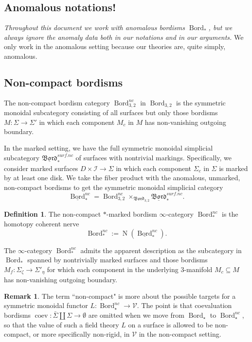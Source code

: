 \documentclass[reqno]{amsart}
\theoremstyle{definition}
\newtheorem{definition}[lemma]{Definition}
\newtheorem{remark}[lemma]{Remark}
\newcommand{\mfk}[1]{\mathfrak{#1}}
\newcommand{\mcl}[1]{\mathcal{#1}}
\newcommand{\msc}[1]{\mathscr{#1}}
\newcommand{\opn}[1]{\operatorname{#1}}
\DeclareMathOperator{\Bord}{Bord}
\renewcommand{\1}{\mathbf{1}}
\begin{document}
\subsection{Anomalous notations!}

{\it Throughout this document we work with anomalous bordisms $\Bord_{\ast}$, but we always ignore the anomaly data both in our notations and in our arguments.} We only work in the anomalous setting because our theories are, quite simply, anomalous.

\subsection{Non-compact bordisms}
\label{sect:nc_bord}

The non-compact bordism category $\Bord^{nc}_{3,2}$ in $\Bord_{3,2}$ is the symmetric monoidal subcategory consisting of all surfaces but only those bordisms $M:\Sigma\to \Sigma'$ in which each component $M_c$ in $M$ has non-vanishing outgoing boundary.

In the marked setting, we have the full symmetric monoidal simplicial subcategory $\underline{\mfk{Bord}}_{\ast}^{surf.nc}$ of surfaces with nontrivial markings.  Specifically, we consider marked surfaces $D\times\mcl{I}\to \Sigma$ in which each component $\Sigma_c$ in $\Sigma$ is marked by at least one disk.  We take the fiber product with the anomalous, unmarked, non-compact bordisms to get the symmetric monoidal simplicial category
\[
\underline{\Bord}_{\ast}^{nc}=\Bord^{nc}_{3,2}\times_{\mfk{Bord}_{3,2}}\underline{\mfk{Bord}}_{\ast}^{surf.nc}.
\]

\begin{definition}\label{def:bord_nc}
The non-compact $\ast$-marked bordism $\infty$-category $\Bord_{\ast}^{nc}$ is the homotopy coherent nerve
\[
\Bord_{\ast}^{nc}:=\opn{N}(\underline{\Bord}_{\ast}^{nc}).
\]
\end{definition}

The $\infty$-category $\Bord_{\ast}^{nc}$ admits the apparent description as the subcategory in $\Bord_{\ast}$ spanned by nontrivially marked surfaces and those bordisms $M_f:\Sigma_{\zeta}\to \Sigma'_{\eta}$ for which each component in the underlying $3$-manifold $M_c\subseteq M$ has non-vanishing outgoing boundary.

\begin{remark}
The term ``non-compact" is more about the possible targets for a symmetric monoidal functor $L:\Bord^{nc}_{\star}\to \msc{V}$.  The point is that coevaluation bordisms $\opn{coev}:\bar{\Sigma}\amalg \Sigma\to \emptyset$ are omitted when we move from $\Bord_{\star}$ to $\Bord^{nc}_{\star}$, so that the value of such a field theory $L$ on a surface is allowed to be non-compact, or more specifically non-rigid, in $\msc{V}$ in the non-compact setting.
\end{remark}
\end{document}
